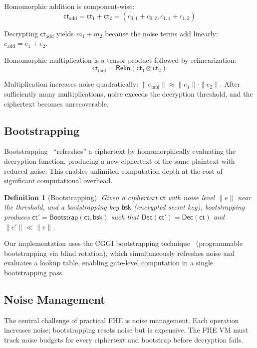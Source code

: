 \documentclass[11pt,a4paper]{article}
\newtheorem{definition}{Definition}[section]
\begin{document}
Homomorphic addition is component-wise:
\[
  \textsf{ct}_{\text{add}} = \textsf{ct}_1 + \textsf{ct}_2 = (c_{0,1} + c_{0,2}, c_{1,1} + c_{1,2})
\]

Decrypting $\textsf{ct}_{\text{add}}$ yields $m_1 + m_2$ because the noise terms
add linearly: $e_{\text{add}} = e_1 + e_2$.

Homomorphic multiplication is a tensor product followed by relinearization:
\[
  \textsf{ct}_{\text{mul}} = \textsf{Relin}(\textsf{ct}_1 \otimes \textsf{ct}_2)
\]

Multiplication increases noise quadratically: $\|e_{\text{mul}}\| \approx \|e_1\|
\cdot \|e_2\|$. After sufficiently many multiplications, noise exceeds the decryption
threshold, and the ciphertext becomes unrecoverable.

\subsection{Bootstrapping}

Bootstrapping~\cite{gentry2009fhe} ``refreshes'' a ciphertext by homomorphically
evaluating the decryption function, producing a new ciphertext of the same plaintext
with reduced noise. This enables unlimited computation depth at the cost of
significant computational overhead.

\begin{definition}[Bootstrapping]
Given a ciphertext $\textsf{ct}$ with noise level $\|e\|$ near the threshold, and
a bootstrapping key $\textsf{bsk}$ (encrypted secret key), bootstrapping produces
$\textsf{ct}' = \textsf{Bootstrap}(\textsf{ct}, \textsf{bsk})$ such that
$\textsf{Dec}(\textsf{ct}') = \textsf{Dec}(\textsf{ct})$ and $\|e'\| \ll \|e\|$.
\end{definition}

Our implementation uses the CGGI bootstrapping technique~\cite{cggi2020tfhe}
(programmable bootstrapping via blind rotation), which simultaneously refreshes
noise and evaluates a lookup table, enabling gate-level computation in a single
bootstrapping pass.

\subsection{Noise Management}

The central challenge of practical FHE is noise management. Each operation increases
noise; bootstrapping resets noise but is expensive. The FHE VM must track noise
budgets for every ciphertext and bootstrap before decryption fails.
\end{document}
